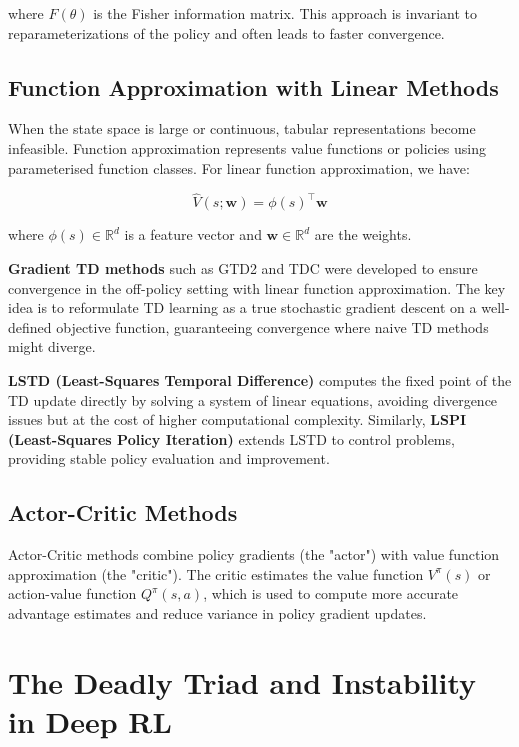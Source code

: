 \documentclass[12pt,a4paper]{report}
\begin{document}
where $F(\theta)$ is the Fisher information matrix. This approach is invariant to reparameterizations of the policy and often leads to faster convergence.

\subsection{Function Approximation with Linear Methods}

When the state space is large or continuous, tabular representations become infeasible. Function approximation represents value functions or policies using parameterised function classes. For linear function approximation, we have:

\begin{equation}
\hat{V}(s; \mathbf{w}) = \phi(s)^\top \mathbf{w}
\end{equation}

where $\phi(s) \in \mathbb{R}^d$ is a feature vector and $\mathbf{w} \in \mathbb{R}^d$ are the weights.

\textbf{Gradient TD methods} \cite{bradtke1996linear, lagoudakis2003least} such as GTD2 and TDC were developed to ensure convergence in the off-policy setting with linear function approximation. The key idea is to reformulate TD learning as a true stochastic gradient descent on a well-defined objective function, guaranteeing convergence where naive TD methods might diverge.

\textbf{LSTD (Least-Squares Temporal Difference)} \cite{bradtke1996linear} computes the fixed point of the TD update directly by solving a system of linear equations, avoiding divergence issues but at the cost of higher computational complexity. Similarly, \textbf{LSPI (Least-Squares Policy Iteration)} \cite{lagoudakis2003least} extends LSTD to control problems, providing stable policy evaluation and improvement.

\subsection{Actor-Critic Methods}

Actor-Critic methods combine policy gradients (the "actor") with value function approximation (the "critic"). The critic estimates the value function $V^\pi(s)$ or action-value function $Q^\pi(s,a)$, which is used to compute more accurate advantage estimates and reduce variance in policy gradient updates.

\section{The Deadly Triad and Instability in Deep RL}
\end{document}
